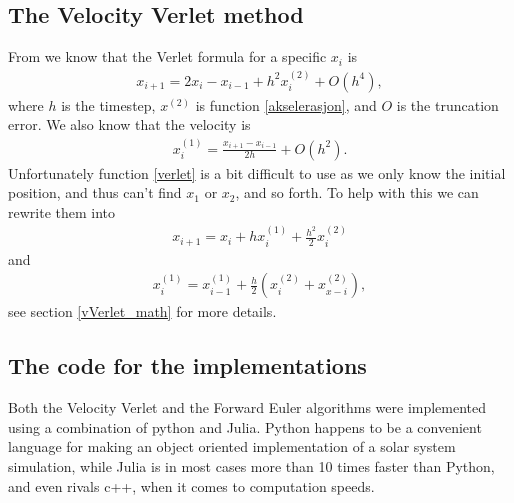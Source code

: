 \documentclass[a4paper]{article}
\begin{document}
	
	
	\subsection{The Velocity Verlet method}
	From \cite{lecture notes} we know that the Verlet formula for a specific $x_i$ is
	\begin{align}
	x_{i+1} = 2x_i - x_{i-1} + h^2 x_i^{(2)} + O(h^4) \label{verlet},
	\end{align}
	where $h$ is the timestep, $x^{(2)}$ is function \ref{akselerasjon}, and $O$ is the truncation error. We also know that the velocity is
	\begin{align}
	x_i^{(1)} = \frac{x_{i+1} - x_{i-1}}{2h} + O(h^2). \label{vVerlet}
	\end{align}
	Unfortunately function \ref{verlet} is a bit difficult to use as we only know the initial position, and thus can't find $x_1$ or $x_2$, and so forth. To help with this we can rewrite them into
	\begin{align}
	x_{i+1} = x_i + hx_i^{(1)} + \frac{h^2}{2}x_i^{(2)} \label{velVerlet}
	\end{align}
	and
	\begin{align}
	x_i^{(1)} = x_{i-1}^{(1)} + \frac{h}{2} \left( x_i^{(2)} + x_{x-i}^{(2)} \right) \label{VvelVerlet},
	\end{align}
	see section \ref{vVerlet_math} for more details.
	
	
	\subsection{The code for the implementations}
	Both the Velocity Verlet and the Forward Euler algorithms were implemented using a combination of python and Julia. Python happens to be a convenient language for making an object oriented implementation of a solar system simulation, while Julia is in most cases more than 10 times faster than Python, and even rivals c++, when it comes to computation speeds.
	
	
\end{document}

